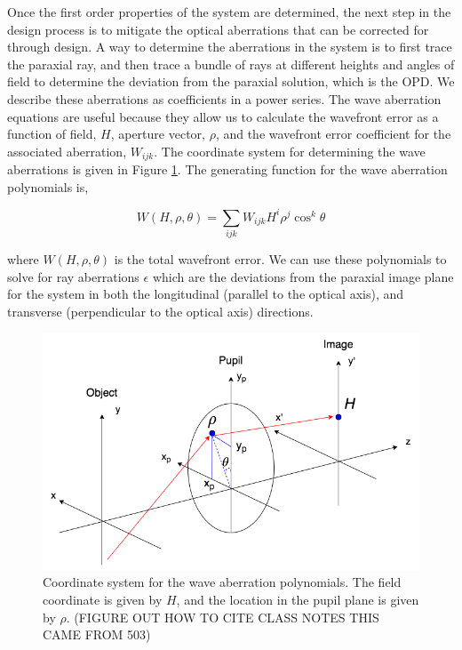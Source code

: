 Once the first order properties of the system are determined, the next step in the design process is to mitigate the optical aberrations that can be corrected for through design. A way to determine the aberrations in the system is to first trace the paraxial ray, and then trace a bundle of rays at different heights and angles of field to determine the deviation from the paraxial solution, which is the OPD. We describe these aberrations as coefficients in a power series. The wave aberration equations are useful because they allow us to calculate the wavefront error as a function of field, $H$, aperture vector, $\rho$, and the wavefront error coefficient for the associated aberration, $W_{ijk}$. The coordinate system for determining the wave aberrations is given in Figure \ref{fig:Seidel}. The generating function for the wave aberration polynomials is,


\begin{equation}
    W(H,\rho, \theta)=\sum_{ijk} W_{ijk} H^i \rho^j \cos^k\theta
\end{equation}

where $W(H,\rho, \theta)$ is the total wavefront error. We can use these polynomials to solve for ray aberrations $\epsilon$ which are the deviations from the paraxial image plane for the system in both the longitudinal (parallel to the optical axis), and transverse (perpendicular to the optical axis) directions. 

\begin{figure}
    \centering
    \includegraphics[width=.8\textwidth]{Chapter Materials/Chapter Three Materials/Seidelcoord.png}
    \caption{Coordinate system for the wave aberration polynomials. The field coordinate is given by $H$, and the location in the pupil plane is given by $\rho$. (FIGURE OUT HOW TO CITE CLASS NOTES THIS CAME FROM 503)}
    \label{fig:Seidel}
    \end{figure}
    
